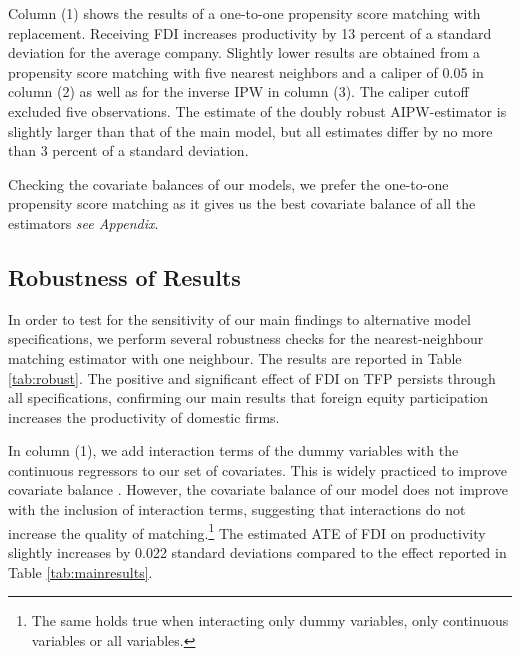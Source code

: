 \documentclass[a4paper,11pt]{scrartcl}
\begin{document}
Column (1) shows the results of a one-to-one propensity score matching with replacement. Receiving FDI increases productivity by 13 percent of a standard deviation for the average company. Slightly lower results are obtained from a propensity score matching with five nearest neighbors and a caliper of 0.05 in column (2) as well as for the inverse IPW in column (3). The caliper cutoff excluded five observations. The estimate of the doubly robust AIPW-estimator is slightly larger than that of the main model, but all estimates differ by no more than 3 percent of a standard deviation.

Checking the covariate balances of our models, %
 we prefer the one-to-one propensity score matching as it gives us the best covariate balance of all the estimators \textit{see Appendix}. %


\subsection{Robustness of Results}

In order to test for the sensitivity of our main findings to alternative model specifications, we perform several robustness checks for the nearest-neighbour matching estimator with one neighbour. The results are reported in Table \ref{tab:robust}. The positive and significant effect of FDI on TFP persists through all specifications, confirming our main results that foreign equity participation increases the productivity of domestic firms. 

In column (1), we add interaction terms of the dummy variables with the continuous regressors to our set of covariates. This is widely practiced to improve covariate balance \citep{Caliendo08}.
However, the covariate balance of our model does not improve with the inclusion of interaction terms, suggesting that interactions do not increase the quality of matching.\footnote{The same holds true when interacting only dummy variables, only continuous variables or all variables.} The estimated ATE of FDI on productivity slightly increases by 0.022 standard deviations compared to the effect reported in Table \ref{tab:mainresults}. 
\end{document}
